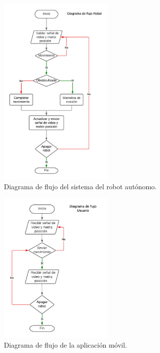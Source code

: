         \vskip 0.5cm
            \begin{figure}[htbp]
                \centering
                \includegraphics[width=0.5\textwidth]{images/desarrollo/diagramas/FlujoRobot.png}
                \caption{Diagrama de flujo del sistema del robot aut\'onomo.}
                \label{fig:FlujoRobot}
            \end{figure}
        \vskip 0.5cm
        \vskip 0.5cm
            \begin{figure}[htbp]
                \centering
                \includegraphics[width=0.5\textwidth]{images/desarrollo/diagramas/FlujoApp.png}
                \caption{Diagrama de flujo de la aplicaci\'on m\'ovil.}
                \label{fig:FlujoApp}
            \end{figure}
